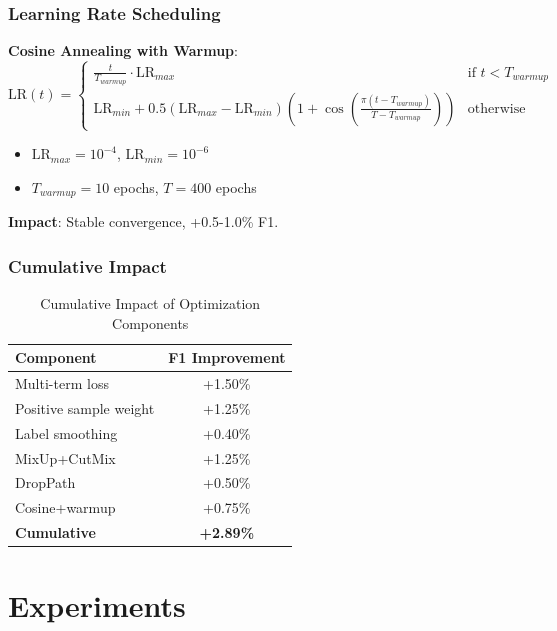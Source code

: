 \documentclass[journal]{IEEEtran}
\begin{document}
\subsubsection{Learning Rate Scheduling}

\textbf{Cosine Annealing with Warmup}:
\begin{equation}
\text{LR}(t) = 
\begin{cases}
\frac{t}{T_{warmup}} \cdot \text{LR}_{max} & \text{if } t < T_{warmup} \\
\text{LR}_{min} + 0.5(\text{LR}_{max}-\text{LR}_{min})\left(1+\cos\left(\frac{\pi(t-T_{warmup})}{T-T_{warmup}}\right)\right) & \text{otherwise}
\end{cases}
\end{equation}
\begin{itemize}
    \item $\text{LR}_{max} = 10^{-4}$, $\text{LR}_{min} = 10^{-6}$
    \item $T_{warmup} = 10$ epochs, $T = 400$ epochs
\end{itemize}

\textbf{Impact}: Stable convergence, +0.5-1.0\% F1.

\subsubsection{Cumulative Impact}

\begin{table}[h]
\centering
\caption{Cumulative Impact of Optimization Components}
\label{tab:optimization_impact}
\begin{tabular}{lc}
\toprule
\textbf{Component} & \textbf{F1 Improvement} \\
\midrule
Multi-term loss & +1.50\% \\
Positive sample weight & +1.25\% \\
Label smoothing & +0.40\% \\
MixUp+CutMix & +1.25\% \\
DropPath & +0.50\% \\
Cosine+warmup & +0.75\% \\
\midrule
\textbf{Cumulative} & \textbf{+2.89\%} \\
\bottomrule
\end{tabular}
\end{table}

\section{Experiments}
\end{document}
